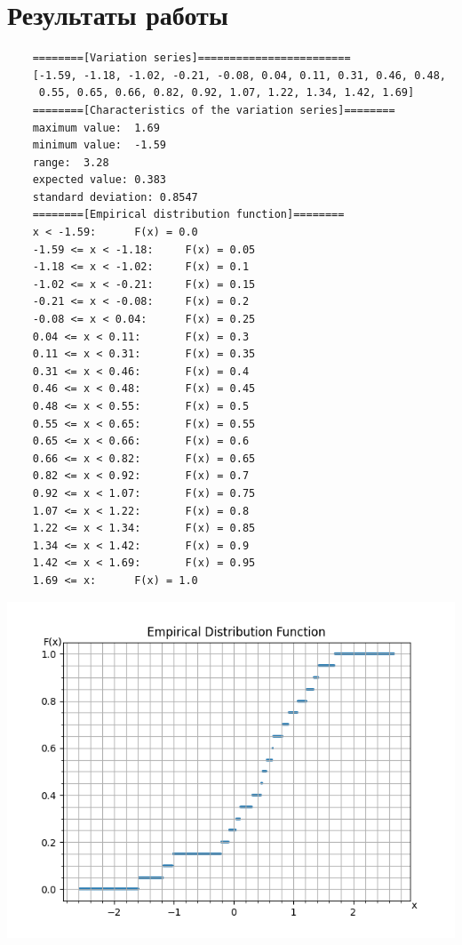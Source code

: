 \documentclass[12pt,one column]{article}
\begin{document}
\section{Результаты работы} 
\begin{verbatim}
    ========[Variation series]========================
    [-1.59, -1.18, -1.02, -0.21, -0.08, 0.04, 0.11, 0.31, 0.46, 0.48,
     0.55, 0.65, 0.66, 0.82, 0.92, 1.07, 1.22, 1.34, 1.42, 1.69]
    ========[Characteristics of the variation series]========
    maximum value:  1.69
    minimum value:  -1.59
    range:  3.28
    expected value: 0.383
    standard deviation: 0.8547
    ========[Empirical distribution function]========
    x < -1.59:      F(x) = 0.0
    -1.59 <= x < -1.18:     F(x) = 0.05
    -1.18 <= x < -1.02:     F(x) = 0.1
    -1.02 <= x < -0.21:     F(x) = 0.15
    -0.21 <= x < -0.08:     F(x) = 0.2
    -0.08 <= x < 0.04:      F(x) = 0.25
    0.04 <= x < 0.11:       F(x) = 0.3
    0.11 <= x < 0.31:       F(x) = 0.35
    0.31 <= x < 0.46:       F(x) = 0.4
    0.46 <= x < 0.48:       F(x) = 0.45
    0.48 <= x < 0.55:       F(x) = 0.5
    0.55 <= x < 0.65:       F(x) = 0.55
    0.65 <= x < 0.66:       F(x) = 0.6
    0.66 <= x < 0.82:       F(x) = 0.65
    0.82 <= x < 0.92:       F(x) = 0.7
    0.92 <= x < 1.07:       F(x) = 0.75
    1.07 <= x < 1.22:       F(x) = 0.8
    1.22 <= x < 1.34:       F(x) = 0.85
    1.34 <= x < 1.42:       F(x) = 0.9
    1.42 <= x < 1.69:       F(x) = 0.95
    1.69 <= x:      F(x) = 1.0
\end{verbatim}
\includegraphics[width=\textwidth]{img/plot1.png}
\end{document}
